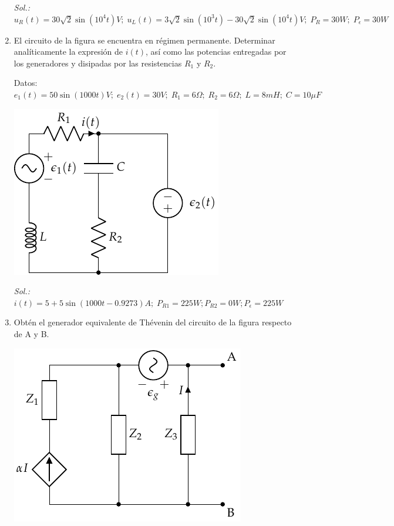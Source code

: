 \begin{enumerate}
  \emph{Sol.:
    $u_R(t) = 30\sqrt{2}\sin(10^4 t) V;\; u_L(t) = 3\sqrt{2}\sin(10^3
    t) - 30\sqrt{2}\sin(10^4 t) V;\; P_R = {30}{W};\; P_\epsilon =
    {30}{W}$}

\item El circuito de la figura se encuentra en régimen
  permanente. Determinar analíticamente la expresión de $i(t)$, así
  como las potencias entregadas por los generadores y disipadas por
  las resistencias $R_1$ y $R_2$.

  Datos:
  $e_1(t) = {50 \sin(1000 t)} V;\; e_2(t) = {30}{V};\; R_1 =
  {6}{\Omega};\; R_2 = {6}{\Omega};\; L = {8}{mH};\; C = {10}{\mu F}$

  \begin{center}
    \includegraphics{../figs/superposicion1_ej.pdf}
  \end{center}
  \emph{Sol.:
    $i(t) = 5 + 5\sin(1000t - 0.9273){A};\; P_{R1} = {225}{W}; P_{R2}
    = {0}{W}; P_{\epsilon} = {225}{W}$}

\item   Obtén el generador equivalente de Thévenin del circuito de la figura
  respecto de A y B.

\begin{center}
  \includegraphics{../figs/Thevenin4}
\end{center}


\end{enumerate}
